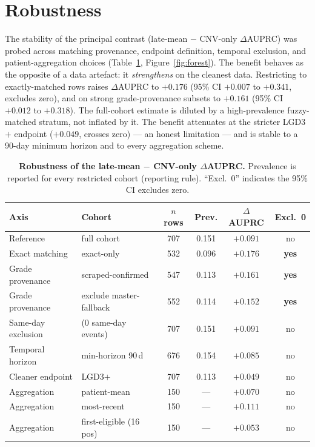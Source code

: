 \section{Robustness}
\label{sec:robustness}

The stability of the principal contrast (late-mean $-$ CNV-only $\Delta$AUPRC)
was probed across matching provenance, endpoint definition, temporal exclusion,
and patient-aggregation choices (Table~\ref{tab:robustness},
Figure~\ref{fig:forest}). The benefit behaves as the opposite of a data
artefact: it \emph{strengthens} on the cleanest data. Restricting to
exactly-matched rows raises $\Delta$AUPRC to $+0.176$ (95\% CI $+0.007$ to
$+0.341$, excludes zero), and on strong grade-provenance subsets to $+0.161$
(95\% CI $+0.012$ to $+0.318$). The full-cohort estimate is diluted by a
high-prevalence fuzzy-matched stratum, not inflated by it. The benefit
attenuates at the stricter LGD3$+$ endpoint ($+0.049$, crosses zero) --- an
honest limitation --- and is stable to a 90-day minimum horizon and to every
aggregation scheme.

\begin{table}[htbp]
  \centering
  \caption[Robustness of the multimodal benefit]{\textbf{Robustness of the
  late-mean $-$ CNV-only $\Delta$AUPRC.} Prevalence is reported for every
  restricted cohort (reporting rule). ``Excl.\ 0'' indicates the 95\% CI
  excludes zero.}
  \label{tab:robustness}
  \begin{tabular}{llcccc}
    \hline
    Axis & Cohort & $n$ rows & Prev. & $\Delta$AUPRC & Excl.\ 0 \\
    \hline
    Reference           & full cohort            & 707 & 0.151 & $+0.091$ & no \\
    Exact matching      & exact-only             & 532 & 0.096 & $+0.176$ & \textbf{yes} \\
    Grade provenance    & scraped-confirmed      & 547 & 0.113 & $+0.161$ & \textbf{yes} \\
    Grade provenance    & exclude master-fallback& 552 & 0.114 & $+0.152$ & \textbf{yes} \\
    Same-day exclusion  & (0 same-day events)    & 707 & 0.151 & $+0.091$ & no \\
    Temporal horizon    & min-horizon 90\,d      & 676 & 0.154 & $+0.085$ & no \\
    Cleaner endpoint    & LGD3$+$                & 707 & 0.113 & $+0.049$ & no \\
    Aggregation         & patient-mean           & 150 & ---   & $+0.070$ & no \\
    Aggregation         & most-recent            & 150 & ---   & $+0.111$ & no \\
    Aggregation         & first-eligible (16 pos)& 150 & ---   & $+0.053$ & no \\
    \hline
  \end{tabular}
\end{table}

